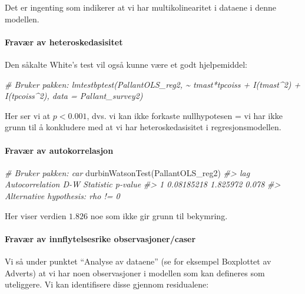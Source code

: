 \documentclass[
]{article}
\newenvironment{Shaded}{\begin{snugshade}}{\end{snugshade}}
\newcommand{\CommentTok}[1]{\textcolor[rgb]{0.56,0.35,0.01}{\textit{#1}}}
\newcommand{\FunctionTok}[1]{\textcolor[rgb]{0.00,0.00,0.00}{#1}}
\newcommand{\NormalTok}[1]{#1}
\begin{document}
Det er ingenting som indikerer at vi har multikolinearitet i dataene i denne modellen.

\hypertarget{fravuxe6r-av-heteroskedasisitet-1}{%
\paragraph{Fravær av heteroskedasisitet}\label{fravuxe6r-av-heteroskedasisitet-1}}

Den såkalte White's test vil også kunne være et godt hjelpemiddel:

\begin{Shaded}
\begin{Highlighting}[]
\CommentTok{\# Bruker pakken: lmtestbptest(PallantOLS\_reg2, \textasciitilde{} tmast*tpcoiss + I(tmast\^{}2) + I(tpcoiss\^{}2), data = Pallant\_survey2)}
\end{Highlighting}
\end{Shaded}

Her ser vi at \(p < 0.001\), dvs. vi kan ikke forkaste nullhypotesen = vi har ikke grunn til å konkludere med at vi har heteroskedasisitet i regresjonsmodellen.

\hypertarget{fravuxe6r-av-autokorrelasjon-1}{%
\paragraph{Fravær av autokorrelasjon}\label{fravuxe6r-av-autokorrelasjon-1}}

\begin{Shaded}
\begin{Highlighting}[]
\CommentTok{\# Bruker pakken: car}
\FunctionTok{durbinWatsonTest}\NormalTok{(PallantOLS\_reg2)}
\CommentTok{\#\textgreater{}  lag Autocorrelation D{-}W Statistic p{-}value}
\CommentTok{\#\textgreater{}    1      0.08185218      1.825972   0.078}
\CommentTok{\#\textgreater{}  Alternative hypothesis: rho != 0}
\end{Highlighting}
\end{Shaded}

Her viser verdien \(1.826\) noe som ikke gir grunn til bekymring.

\hypertarget{fravuxe6r-av-innflytelsesrike-observasjonercaser-1}{%
\paragraph{Fravær av innflytelsesrike observasjoner/caser}\label{fravuxe6r-av-innflytelsesrike-observasjonercaser-1}}

Vi så under punktet ``Analyse av dataene'' (se for eksempel Boxplottet av Adverts) at vi har noen observasjoner i modellen som kan defineres som uteliggere. Vi kan identifisere disse gjennom residualene:
\end{document}
